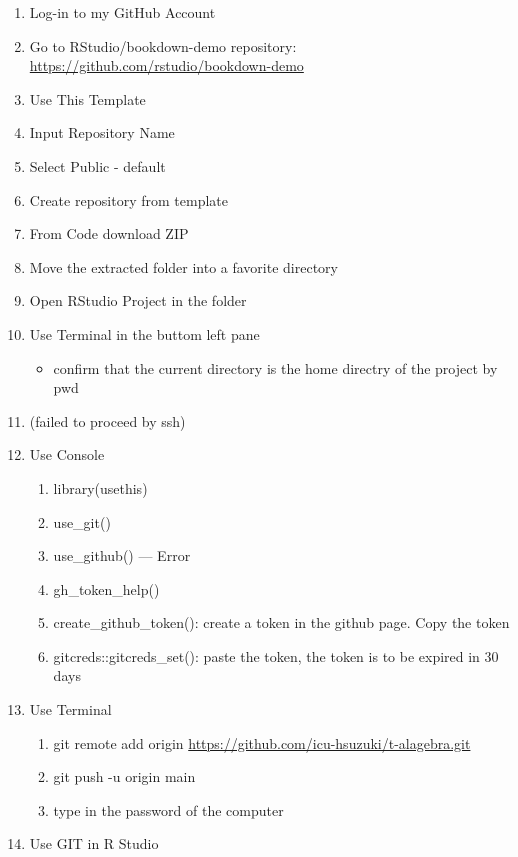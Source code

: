 \documentclass[
]{book}
\providecommand{\tightlist}{%
  \setlength{\itemsep}{0pt}\setlength{\parskip}{0pt}}
\theoremstyle{definition}
\theoremstyle{definition}
\theoremstyle{definition}
\theoremstyle{definition}
\theoremstyle{remark}
\begin{document}
\begin{enumerate}
\def\labelenumi{\arabic{enumi}.}
\tightlist
\item
  Log-in to my GitHub Account
\item
  Go to RStudio/bookdown-demo repository: \url{https://github.com/rstudio/bookdown-demo}
\item
  Use This Template
\item
  Input Repository Name
\item
  Select Public - default
\item
  Create repository from template
\item
  From Code download ZIP
\item
  Move the extracted folder into a favorite directory
\item
  Open RStudio Project in the folder
\item
  Use Terminal in the buttom left pane

  \begin{itemize}
  \tightlist
  \item
    confirm that the current directory is the home directry of the project by pwd
  \end{itemize}
\item
  (failed to proceed by ssh)
\item
  Use Console

  \begin{enumerate}
  \def\labelenumii{\arabic{enumii}.}
  \tightlist
  \item
    library(usethis)
  \item
    use\_git()
  \item
    use\_github() --- Error
  \item
    gh\_token\_help()
  \item
    create\_github\_token(): create a token in the github page. Copy the token
  \item
    gitcreds::gitcreds\_set(): paste the token, the token is to be expired in 30 days
  \end{enumerate}
\item
  Use Terminal

  \begin{enumerate}
  \def\labelenumii{\arabic{enumii}.}
  \tightlist
  \item
    git remote add origin \url{https://github.com/icu-hsuzuki/t-alagebra.git}
  \item
    git push -u origin main
  \item
    type in the password of the computer
  \end{enumerate}
\item
  Use GIT in R Studio
\end{enumerate}
\end{document}
